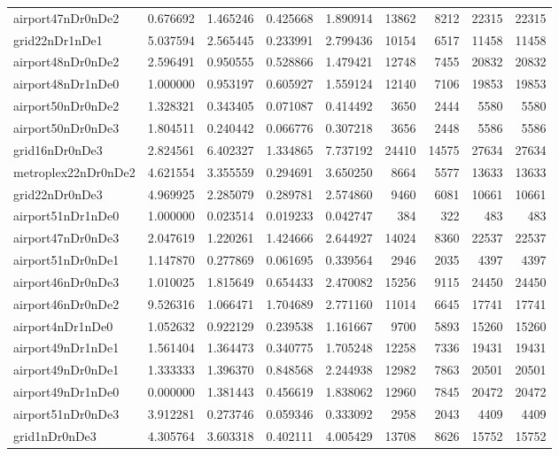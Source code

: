 \begin{longtable}{|l|r|r|r|r|r|r|r|r|}
airport47nDr0nDe2 & 0.676692 & 1.465246 & 0.425668 & 1.890914 & 13862 & 8212 & 22315 & 22315 \\
grid22nDr1nDe1 & 5.037594 & 2.565445 & 0.233991 & 2.799436 & 10154 & 6517 & 11458 & 11458 \\
airport48nDr0nDe2 & 2.596491 & 0.950555 & 0.528866 & 1.479421 & 12748 & 7455 & 20832 & 20832 \\
airport48nDr1nDe0 & 1.000000 & 0.953197 & 0.605927 & 1.559124 & 12140 & 7106 & 19853 & 19853 \\
airport50nDr0nDe2 & 1.328321 & 0.343405 & 0.071087 & 0.414492 & 3650 & 2444 & 5580 & 5580 \\
airport50nDr0nDe3 & 1.804511 & 0.240442 & 0.066776 & 0.307218 & 3656 & 2448 & 5586 & 5586 \\
grid16nDr0nDe3 & 2.824561 & 6.402327 & 1.334865 & 7.737192 & 24410 & 14575 & 27634 & 27634 \\
metroplex22nDr0nDe2 & 4.621554 & 3.355559 & 0.294691 & 3.650250 & 8664 & 5577 & 13633 & 13633 \\
grid22nDr0nDe3 & 4.969925 & 2.285079 & 0.289781 & 2.574860 & 9460 & 6081 & 10661 & 10661 \\
airport51nDr1nDe0 & 1.000000 & 0.023514 & 0.019233 & 0.042747 & 384 & 322 & 483 & 483 \\
airport47nDr0nDe3 & 2.047619 & 1.220261 & 1.424666 & 2.644927 & 14024 & 8360 & 22537 & 22537 \\
airport51nDr0nDe1 & 1.147870 & 0.277869 & 0.061695 & 0.339564 & 2946 & 2035 & 4397 & 4397 \\
airport46nDr0nDe3 & 1.010025 & 1.815649 & 0.654433 & 2.470082 & 15256 & 9115 & 24450 & 24450 \\
airport46nDr0nDe2 & 9.526316 & 1.066471 & 1.704689 & 2.771160 & 11014 & 6645 & 17741 & 17741 \\
airport4nDr1nDe0 & 1.052632 & 0.922129 & 0.239538 & 1.161667 & 9700 & 5893 & 15260 & 15260 \\
airport49nDr1nDe1 & 1.561404 & 1.364473 & 0.340775 & 1.705248 & 12258 & 7336 & 19431 & 19431 \\
airport49nDr0nDe1 & 1.333333 & 1.396370 & 0.848568 & 2.244938 & 12982 & 7863 & 20501 & 20501 \\
airport49nDr1nDe0 & 0.000000 & 1.381443 & 0.456619 & 1.838062 & 12960 & 7845 & 20472 & 20472 \\
airport51nDr0nDe3 & 3.912281 & 0.273746 & 0.059346 & 0.333092 & 2958 & 2043 & 4409 & 4409 \\
grid1nDr0nDe3 & 4.305764 & 3.603318 & 0.402111 & 4.005429 & 13708 & 8626 & 15752 & 15752 \\

\end{longtable}

